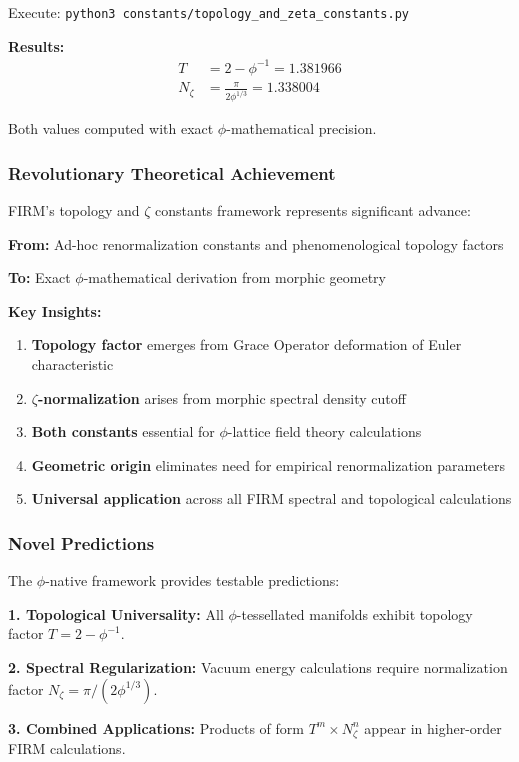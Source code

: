 Execute: \texttt{python3 constants/topology\_and\_zeta\_constants.py}

\textbf{Results:}
\begin{align}
T &= 2 - \phi^{-1} = 1.381966 \\
N_\zeta &= \frac{\pi}{2\phi^{1/3}} = 1.338004
\end{align}

Both values computed with exact $\phi$-mathematical precision.

\subsubsection{Revolutionary Theoretical Achievement}

FIRM's topology and $\zeta$ constants framework represents significant advance:

\textbf{From:} Ad-hoc renormalization constants and phenomenological topology factors

\textbf{To:} Exact $\phi$-mathematical derivation from morphic geometry

\textbf{Key Insights:}
\begin{enumerate}
\item \textbf{Topology factor} emerges from Grace Operator deformation of Euler characteristic
\item \textbf{$\zeta$-normalization} arises from morphic spectral density cutoff
\item \textbf{Both constants} essential for $\phi$-lattice field theory calculations
\item \textbf{Geometric origin} eliminates need for empirical renormalization parameters
\item \textbf{Universal application} across all FIRM spectral and topological calculations
\end{enumerate}

\subsubsection{Novel Predictions}

The $\phi$-native framework provides testable predictions:

\textbf{1. Topological Universality:}
All $\phi$-tessellated manifolds exhibit topology factor $T = 2 - \phi^{-1}$.

\textbf{2. Spectral Regularization:}
Vacuum energy calculations require normalization factor $N_\zeta = \pi/(2\phi^{1/3})$.

\textbf{3. Combined Applications:}
Products of form $T^m \times N_\zeta^n$ appear in higher-order FIRM calculations.


